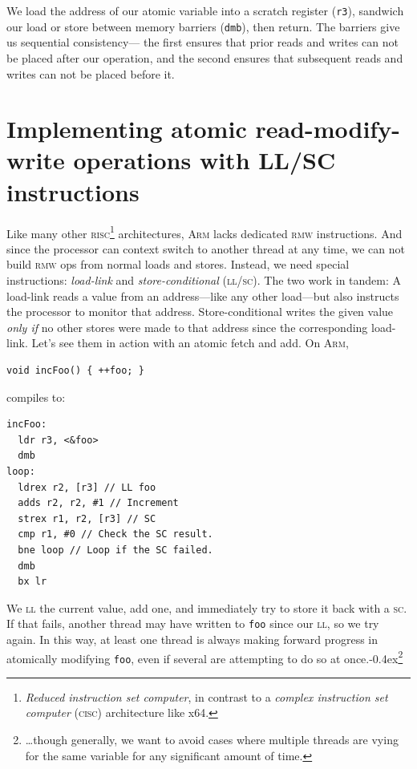 \documentclass[fontsize=10pt, oneside]{scrartcl}
\newcommand{\codesize}{\fontsize{\bodyfontsize}{\bodybaselineskip}}
\newcommand{\punckern}{\kern-0.4ex}
\newcommand{\monobox}[1]{\mbox{\texttt{#1}}}
\newcommand{\keyword}[1]{\monobox{\color{darkGreen}#1}}
\newcommand{\introduce}[1]{\textit{#1}}
\newenvironment{colfigure}
  {\par\vspace{1\baselineskip minus 0.5\baselineskip}\noindent\minipage{\linewidth}}
  {\endminipage\vspace{1\baselineskip minus 0.7\baselineskip}}
\begin{document}
We load the address of our atomic variable into a scratch register (\texttt{r3}),
sandwich our load or store between memory barriers (\keyword{dmb}), then return.
The barriers give us sequential consistency---
the first ensures that prior reads and writes can not be placed after our operation,
and the second ensures that subsequent reads and writes can not be placed before it.

\section{Implementing atomic read-modify-write operations with LL/SC instructions}

Like many other \textsc{risc}\footnote{%
\introduce{Reduced instruction set computer},
in contrast to a \introduce{complex instruction set computer} \textsc{(cisc)} architecture like x64.} architectures,
\textsc{Arm} lacks dedicated \textsc{rmw} instructions.
And since the processor can context switch to another thread at any time,
we can not build \textsc{rmw} ops from normal loads and stores.
Instead, we need special instructions:
\introduce{load-link} and \introduce{store-conditional} \textsc{(ll/sc)}.
The two work in tandem:
A load-link reads a value from an address---like any other load---but also instructs the processor to monitor that address.
Store-conditional writes the given value \emph{only if} no other stores were made to that address since the corresponding load-link.
Let's see them in action with an atomic fetch and add.
On \textsc{Arm},
\begin{colfigure}
\begin{verbatim}
void incFoo() { ++foo; }
\end{verbatim}
compiles to:
\begin{lstlisting}[language={[ARM]Assembler}]
incFoo:
  ldr r3, <&foo>
  dmb
loop:
  ldrex r2, [r3] // LL foo
  adds r2, r2, #1 // Increment
  strex r1, r2, [r3] // SC
  cmp r1, #0 // Check the SC result.
  bne loop // Loop if the SC failed.
  dmb
  bx lr
\end{lstlisting}
\end{colfigure}
We \textsc{ll} the current value, add one, and immediately try to store it back with a \textsc{sc}.
If that fails, another thread may have written to \texttt{foo} since our \textsc{ll}, so we try again.
In this way, at least one thread is always making forward progress in atomically modifying \texttt{foo},
even if several are attempting to do so at once.\punckern\footnote{%
\ldots though generally,
we want to avoid cases where multiple threads are vying for the same variable for any significant amount of time.}
\end{document}

